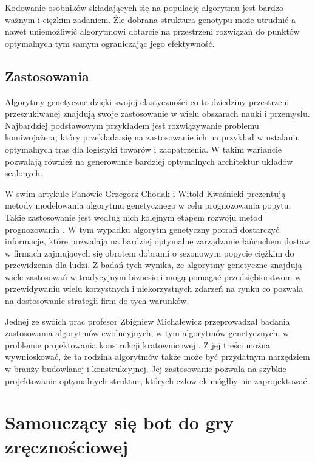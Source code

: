 \documentclass[12pt, oneside, a4paper]{report}
\begin{document}
Kodowanie osobników składających się na populację algorytmu jest bardzo ważnym i ciężkim zadaniem. Źle dobrana struktura genotypu może utrudnić a nawet uniemożliwić algorytmowi dotarcie na przestrzeni rozwiązań do punktów optymalnych tym samym ograniczając jego efektywność.

\section{Zastosowania}

Algorytmy genetyczne dzięki swojej elastyczności co  to dziedziny przestrzeni przeszukiwanej znajdują swoje zastosowanie w wielu obszarach nauki i przemysłu. Najbardziej podstawowym przykładem jest rozwiązywanie problemu komiwojażera, który przekłada się na zastosowanie ich na przykład w ustalaniu optymalnych tras dla logistyki towarów i zaopatrzenia. W takim wariancie pozwalają również na generowanie bardziej optymalnych architektur układów scalonych.

W swim artykule Panowie Grzegorz Chodak i Witold Kwaśnicki prezentują metody modelowania algorytmu genetycznego w celu prognozowania popytu. Takie zastosowanie jest według nich kolejnym etapem rozwoju metod prognozowania \citep{chodak2002zastosowanie}. W tym wypadku algorytm genetyczny potrafi dostarczyć informacje, które pozwalają na bardziej optymalne zarządzanie łańcuchem dostaw w firmach zajmujących się obrotem dobrami o sezonowym popycie ciężkim do przewidzenia dla ludzi. Z badań tych wynika, że algorytmy genetyczne znajdują wiele zastosowań w tradycyjnym biznesie i mogą pomagać przedsiębiorstwom w przewidywaniu wielu korzystnych i niekorzystnych zdarzeń na rynku co pozwala na dostosowanie strategii firm do tych warunków.

Jednej ze swoich prac profesor Zbigniew Michalewicz przeprowadzał badania zastosowania algorytmów ewolucyjnych, w tym algorytmów genetycznych, w problemie projektowania konstrukcji kratownicowej \citep{michalewicz1996evolutionary}. Z jej treści można wywnioskować, że ta rodzina algorytmów także może być przydatnym narzędziem w branży budowlanej i konstrukcyjnej. Jej zastosowanie pozwala na szybkie projektowanie optymalnych struktur, których człowiek mógłby nie zaprojektować.  


\chapter{Samouczący się bot do gry zręcznościowej}
\end{document}
